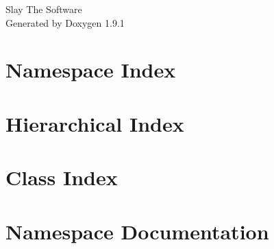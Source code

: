 \let\mypdfximage\pdfximage\def\pdfximage{\immediate\mypdfximage}\documentclass[twoside]{book}
\newcommand{\+}{\discretionary{\mbox{\scriptsize$\hookleftarrow$}}{}{}}
\newcommand{\clearemptydoublepage}{%
  \newpage{\pagestyle{empty}\cleardoublepage}%
}
\begin{document}
\raggedbottom

\hypersetup{pageanchor=false,
             bookmarksnumbered=true,
             pdfencoding=unicode
            }
\begin{titlepage}
\vspace*{7cm}
\begin{center}%
{\Large Slay The Software }\\
\vspace*{1cm}
{\large Generated by Doxygen 1.9.1}\\
\end{center}
\end{titlepage}
\clearemptydoublepage
{}
\tableofcontents
\clearemptydoublepage
{}
\hypersetup{pageanchor=true}

\chapter{Namespace Index}

\chapter{Hierarchical Index}

\chapter{Class Index}

\chapter{Namespace Documentation}



\end{document}
